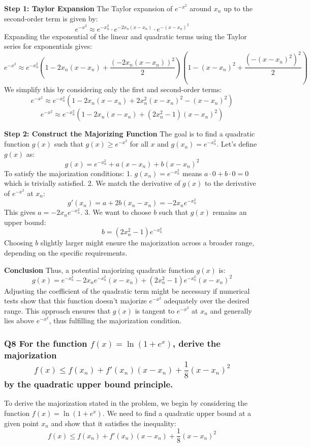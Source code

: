 \documentclass[8pt]{article}
\begin{document}
{\textbf{Step 1: Taylor Expansion}
The Taylor expansion of \( e^{-x^2} \) around \( x_n \) up to the second-order term is given by:
\[
e^{-x^2} \approx e^{-x_n^2} \cdot e^{-2x_n(x-x_n)} \cdot e^{-(x-x_n)^2}
\]
Expanding the exponential of the linear and quadratic terms using the Taylor series for exponentials gives:
\[
e^{-x^2} \approx e^{-x_n^2} \left(1 - 2x_n(x-x_n) + \frac{(-2x_n(x-x_n))^2}{2}\right) \left(1 - (x-x_n)^2 + \frac{(-(x-x_n)^2)^2}{2}\right)
\]
We simplify this by considering only the first and second-order terms:
\[
e^{-x^2} \approx e^{-x_n^2} \left(1 - 2x_n(x-x_n) + 2x_n^2(x-x_n)^2 - (x-x_n)^2\right)
\]
\[
e^{-x^2} \approx e^{-x_n^2} \left(1 - 2x_n(x-x_n) + (2x_n^2 - 1)(x-x_n)^2\right)
\]

\textbf{Step 2: Construct the Majorizing Function}
The goal is to find a quadratic function \( g(x) \) such that \( g(x) \geq e^{-x^2} \) for all \( x \) and \( g(x_n) = e^{-x_n^2} \). Let's define \( g(x) \) as:
\[
g(x) = e^{-x_n^2} + a(x-x_n) + b(x-x_n)^2
\]
To satisfy the majorization conditions:
1. \( g(x_n) = e^{-x_n^2} \) means \( a \cdot 0 + b \cdot 0 = 0 \) which is trivially satisfied.
2. We match the derivative of \( g(x) \) to the derivative of \( e^{-x^2} \) at \( x_n \):
   \[
   g'(x_n) = a + 2b(x_n-x_n) = -2x_n e^{-x_n^2}
   \]
   This gives \( a = -2x_n e^{-x_n^2} \).
3. We want to choose \( b \) such that \( g(x) \) remains an upper bound:
   \[
   b = (2x_n^2 - 1) e^{-x_n^2}
   \]
   Choosing \( b \) slightly larger might ensure the majorization across a broader range, depending on the specific requirements.

\textbf{Conclusion}
Thus, a potential majorizing quadratic function \( g(x) \) is:
\[
g(x) = e^{-x_n^2} - 2x_n e^{-x_n^2} (x - x_n) + (2x_n^2 - 1) e^{-x_n^2} (x - x_n)^2
\]
Adjusting the coefficient of the quadratic term might be necessary if numerical tests show that this function doesn't majorize \( e^{-x^2} \) adequately over the desired range. This approach ensures that \( g(x) \) is tangent to \( e^{-x^2} \) at \( x_n \) and generally lies above \( e^{-x^2} \), thus fulfilling the majorization condition.

\subsubsection*{Q8 For the function \( f(x) = \ln(1 + e^x) \), derive the majorization
\[
f(x) \leq f(x_n) + f'(x_n)(x - x_n) + \frac{1}{8} (x - x_n)^2
\]
by the quadratic upper bound principle.}

To derive the majorization stated in the problem, we begin by considering the function \( f(x) = \ln(1 + e^x) \). We need to find a quadratic upper bound at a given point \( x_n \) and show that it satisfies the inequality:
\[
f(x) \leq f(x_n) + f'(x_n)(x - x_n) + \frac{1}{8} (x - x_n)^2
\]

}
\end{document}
